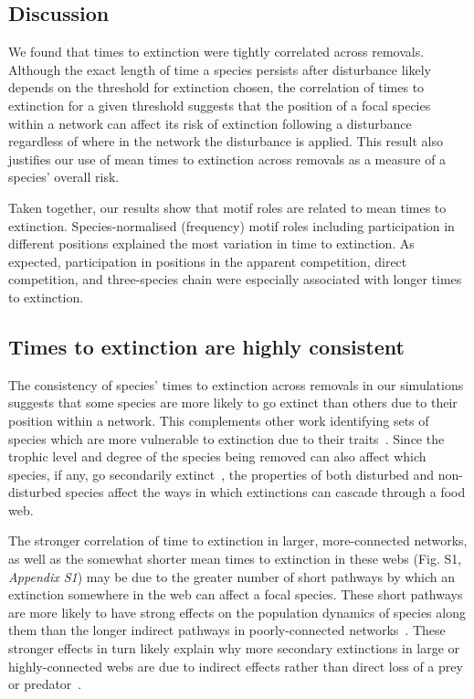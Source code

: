 \documentclass[12pt]{article}
\begin{document}
\begin{spacing}{1.0}
    
\section*{Discussion}

    We found that times to extinction were tightly correlated across removals. 
    Although the exact length of time a species persists after disturbance likely depends on the threshold for extinction chosen, the correlation of times to extinction for a given threshold suggests that the position of a focal species within a network can affect its risk of extinction following a disturbance regardless of where in the network the disturbance is applied. 
    This result also justifies our use of mean times to extinction across removals as a measure of a species' overall risk.
    
    
    Taken together, our results show that motif roles are related to mean times to extinction.
    Species-normalised (frequency) motif roles including participation in different positions explained the most variation in time to extinction.
    As expected, participation in positions in the apparent competition, direct competition, and three-species chain were especially associated with longer times to extinction.


 	\subsection*{Times to extinction are highly consistent}

		The consistency of species' times to extinction across removals in our simulations suggests that some species are more likely to go extinct than others due to their position within a network.
        This complements other work identifying sets of species which are more vulnerable to extinction due to their traits~\citep{Curtsdotter2011,Ryser2019}. 
		Since the trophic level and degree of the species being removed can also affect which species, if any, go secondarily extinct~\citep{Wootton2016a,Dunne2002}, the properties of both disturbed and non-disturbed species affect the ways in which extinctions can cascade through a food web.
		
		
		The stronger correlation of time to extinction in larger, more-connected networks, as well as the somewhat shorter mean times to extinction in these webs (Fig. S1, \emph{Appendix S1}) may be due to the greater number of short pathways by which an extinction somewhere in the web can affect a focal species. 
		These short pathways are more likely to have strong effects on the population dynamics of species along them than the longer indirect pathways in poorly-connected networks~\citep{Jordan2002,Jordan2006}.
		These stronger effects in turn likely explain why more secondary extinctions in large or highly-connected webs are due to indirect effects rather than direct loss of a prey or predator~\citep{Wootton2016a}. 



\end{spacing}
\end{document}
